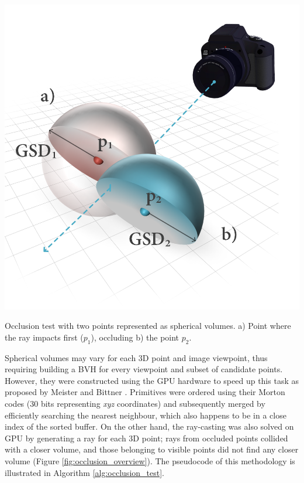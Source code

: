 \begin{marginfigure}[.0cm]
	\centering
	\includegraphics{figs/thermal_projection/occlusion_spheres.png}
	\caption{Occlusion test with two points represented as spherical volumes. a) Point where the ray impacts first ($p_1$), occluding b) the point $p_2$.}
	\label{fig:occlusion_overview}
\end{marginfigure}
Spherical volumes may vary for each 3D point and image viewpoint, thus requiring building a BVH for every viewpoint and  subset of candidate points. However, they were constructed using the GPU hardware to speed up this task as proposed by Meister and Bittner \cite{meister_parallel_2018}. Primitives were ordered using their Morton codes (30 bits representing \textit{xyz} coordinates) and subsequently merged by efficiently searching the nearest neighbour, which also happens to be in a close index of the sorted buffer. On the other hand, the ray-casting was also solved on GPU by generating a ray for each 3D point; rays from occluded points collided with a closer volume, and those belonging to visible points did not find any closer volume (Figure \ref{fig:occlusion_overview}). The pseudocode of this methodology is illustrated in Algorithm \ref{alg:occlusion_test}.

